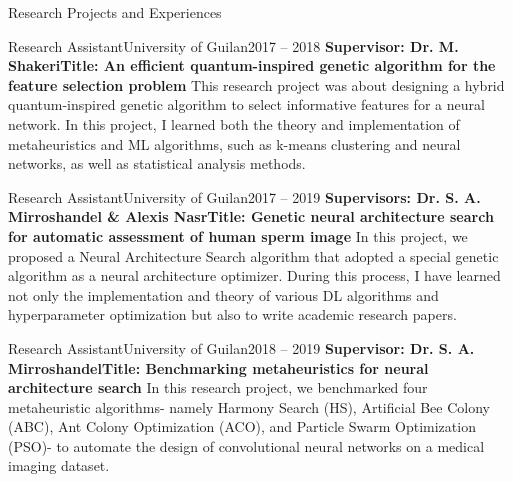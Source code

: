 \documentclass[]{mcdowellcv}
\begin{document}
    \begin{cvsection}{Research Projects and Experiences}
    
    	\begin{cvsubsection}{Research Assistant}{University of Guilan}{2017 -- 2018}
    	    \setlength{\columnsep}{-2.1in}
    	    \textbf{Supervisor: Dr. M. Shakeri\newline Title: An efficient quantum-inspired genetic algorithm for the feature selection problem} \newline
            This research project was about designing a hybrid quantum-inspired genetic algorithm to select informative features for a neural network. In this project, I learned both the theory and implementation of metaheuristics and ML algorithms, such as k-means clustering and neural networks, as well as statistical analysis methods.
    	\end{cvsubsection}
    	
    	\begin{cvsubsection}{Research Assistant}{University of Guilan}{2017 -- 2019}
    	    \setlength{\columnsep}{-2.1in}
    	    \textbf{Supervisors: Dr. S. A. Mirroshandel \& Alexis Nasr\newline Title: Genetic neural architecture search for automatic assessment of human sperm image} \newline
            In this project, we proposed a Neural Architecture Search algorithm that adopted a special genetic algorithm as a neural architecture optimizer. During this process, I have learned not only the implementation and theory of various DL algorithms and hyperparameter optimization but also to write academic research papers.
    	\end{cvsubsection}
    	
    	\begin{cvsubsection}{Research Assistant}{University of Guilan}{2018 -- 2019}
    	    \setlength{\columnsep}{-2.1in}
    	    \textbf{Supervisor: Dr. S. A. Mirroshandel\newline Title: Benchmarking metaheuristics for neural architecture search } \newline
            In this research project, we benchmarked four metaheuristic algorithms- namely Harmony Search (HS), Artificial Bee Colony (ABC), Ant Colony Optimization (ACO), and Particle Swarm Optimization (PSO)- to automate the design of convolutional neural networks on a medical imaging dataset.
    	\end{cvsubsection}
    	

\end{cvsection}
\end{document}
